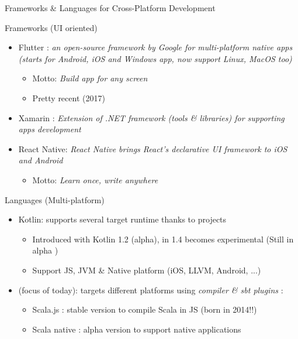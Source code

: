 \documentclass[presentation, 9pt]{beamer}\mode<presentation>{\usetheme{AMSBolognaFC}}
\begin{document}
\begin{frame}{Frameworks \& Languages for Cross-Platform Development}
	\begin{alertblock}{Frameworks (UI oriented)}
			\begin{itemize}
				\item Flutter \href{https://flutter.dev/}{\faLink}: \emph{an open-source framework by Google for multi-platform native apps (starts for Android, iOS and Windows app, now support Linux, MacOS too)}
				\begin{itemize}
					\item Motto: \emph{Build app for any screen}
     			\item Pretty recent (2017)
				\end{itemize}
    		\item Xamarin \href{https://dotnet.microsoft.com/en-us/apps/xamarin}{\faLink}: \emph{
					Extension of .NET framework (tools \& libraries) for supporting apps development
				}
      	\item React Native: \emph{React Native brings React's declarative UI framework to iOS and Android}
				\begin{itemize}
					\item Motto: \emph{Learn once, write anywhere}
				\end{itemize}
			\end{itemize}
	\end{alertblock}
	
	\begin{alertblock}{Languages (Multi-platform)}
		\begin{itemize}
			\item Kotlin: supports several target runtime thanks to  projects \href{https://kotlinlang.org/docs/multiplatform.html}{\faLink}
   			\begin{itemize}
					 \item Introduced with Kotlin 1.2 (alpha), in 1.4 becomes experimental (Still in alpha )
      		 \item Support JS, JVM \& Native platform (iOS, LLVM, Android, ...)
				 \end{itemize}
	 		\item {} (focus of today): targets different platforms using \emph{compiler \& sbt plugins} \href{https://docs.scala-lang.org/overviews/plugins/index.html}{\faLink}:
				\begin{itemize}
					\item Scala.js \href{https://www.scala-js.org/}{\faLink}: stable version to compile Scala in JS (born in 2014!!)
     			\item Scala native \href{https://scala-native.readthedocs.io/en/latest/}{\faLink}: alpha version to support native applications
				\end{itemize}
		\end{itemize}
	\end{alertblock}
\end{frame}
\end{document}
